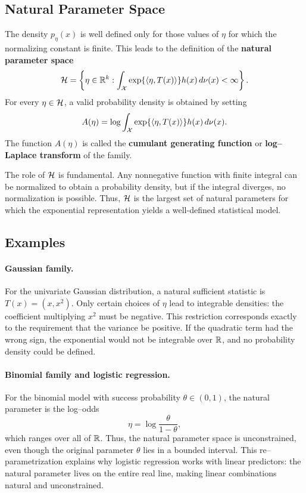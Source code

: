 \subsection{Natural Parameter Space}

The density \(p_{\eta}(x)\) is well defined only for those values of \(\eta\) for which the
normalizing constant is finite.
This leads to the definition of the \textbf{natural parameter space}
\[
    \mathcal{H}
    =
    \left\{
        \eta \in \mathbb{R}^k :
        \int_{\mathcal{X}} \exp\{\langle \eta, T(x) \rangle\} h(x) \, d\nu(x) < \infty
    \right\}.
\]
For every \(\eta \in \mathcal{H}\), a valid probability density is obtained by setting
\[
    A(\eta)
    =
    \log
    \int_{\mathcal{X}}
        \exp\{\langle \eta, T(x) \rangle\} h(x) \, d\nu(x).
\]
The function \(A(\eta)\) is called the \textbf{cumulant generating function} or
\textbf{log--Laplace transform} of the family.

The role of \(\mathcal{H}\) is fundamental.
Any nonnegative function with finite integral can be normalized to obtain a probability
density, but if the integral diverges, no normalization is possible.
Thus, \(\mathcal{H}\) is the largest set of natural parameters for which the exponential
representation yields a well-defined statistical model.

\subsection*{Examples}

\paragraph{Gaussian family.}
For the univariate Gaussian distribution, a natural sufficient statistic is
\(T(x) = (x, x^2)\).
Only certain choices of \(\eta\) lead to integrable densities:
the coefficient multiplying \(x^2\) must be negative.
This restriction corresponds exactly to the requirement that the variance be positive.
If the quadratic term had the wrong sign, the exponential would not be integrable over
\(\mathbb{R}\), and no probability density could be defined.

\paragraph{Binomial family and logistic regression.}
For the binomial model with success probability \(\theta \in (0,1)\), the natural parameter is
the log--odds
\[
    \eta = \log\frac{\theta}{1-\theta},
\]
which ranges over all of \(\mathbb{R}\).
Thus, the natural parameter space is unconstrained, even though the original parameter
\(\theta\) lies in a bounded interval.
This re--parametrization explains why logistic regression works with linear predictors:
the natural parameter lives on the entire real line, making linear combinations natural
and unconstrained.

